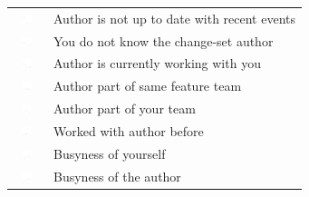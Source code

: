 \begin{table}[t!]
\begin{tabular}{ll}
\vspace{-2pt}\includegraphics[height=10px, width=30px]{figures/sparkles/change-author-is-not-up-to-date-with-recent-events.pdf} & Author is not up to date with recent events\\
\vspace{-2pt}\includegraphics[height=10px, width=30px]{figures/sparkles/don-t-know-the-change-author.pdf} & You do not know the change-set author \\
\vspace{-2pt}\includegraphics[height=10px, width=30px]{figures/sparkles/currently-working-with-the-change-author.pdf} & Author is currently working with you\\
\vspace{-2pt}\includegraphics[height=10px, width=30px]{figures/sparkles/change-author-part-of-the-same-feature-team.pdf} & Author part of same feature team\\
\vspace{-2pt}\includegraphics[height=10px, width=30px]{figures/sparkles/team-of-change-author.pdf} & Author part of your team\\
\vspace{-2pt}\includegraphics[height=10px, width=30px]{figures/sparkles/worked-with-change-author-in-the-past.pdf} & Worked with author before\\
\vspace{-2pt}\includegraphics[height=10px, width=30px]{figures/sparkles/busyness-of-yourself} & Busyness of yourself\\
\vspace{-2pt}\includegraphics[height=10px, width=30px]{figures/sparkles/busyness-of-the-change-author} & Busyness of the author\\

\end{tabular}
\end{table}
